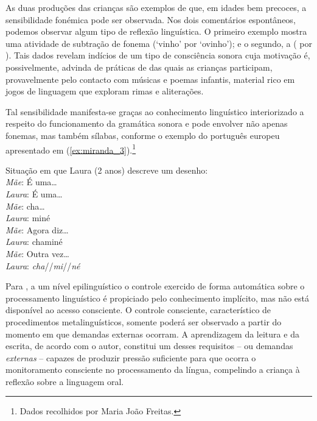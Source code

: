 \documentclass[output=paper]{LSP/langsci}
\begin{document}
\ea\label{ex:miranda_2}
\z
\z

As duas produções das crianças são exemplos de que, em idades bem precoces, a sensibilidade fonémica pode ser observada. Nos dois comentários espontâneos, podemos observar algum tipo de reflexão linguística. O primeiro exemplo mostra uma atividade de subtração de fonema (`vinho' por `ovinho'); e o segundo, a  ( por ). Tais dados revelam indícios de um tipo de consciência sonora cuja motivação é, possivelmente, advinda de práticas de  das quais as crianças participam, provavelmente pelo contacto com músicas e poemas infantis, material rico em jogos de linguagem que exploram rimas e aliterações.

Tal sensibilidade manifesta-se graças ao conhecimento linguístico interiorizado a respeito do funcionamento da gramática sonora e pode envolver não apenas fonemas, mas também sílabas, conforme o exemplo do português europeu apresentado em (\ref{ex:miranda_3}).\footnote{Dados recolhidos por Maria João Freitas.}

\ea\label{ex:miranda_3}
Situação em que Laura (2 anos) descreve um desenho:\\
\textit{Mãe}: É uma\ldots\\
\textit{Laura}: É uma\ldots\\
\textit{Mãe}: cha\ldots\\
\textit{Laura}: miné\\
\textit{Mãe}: Agora diz\ldots\\
\textit{Laura}: chaminé\\
\textit{Mãe}: Outra vez\ldots\\
\textit{Laura}: \textit{cha}//\textit{mi}//\textit{né}
\z

Para \citet{gombert1992,gombert2003}, a um nível epilinguístico o controle exercido de forma automática sobre o processamento linguístico é propiciado pelo conhecimento implícito, mas não está disponível ao acesso consciente. O controle consciente, característico de procedimentos metalinguísticos, somente poderá ser observado a partir do momento em que demandas externas ocorram. A aprendizagem da leitura e da escrita, de acordo com o autor, constitui um desses requisitos -- ou demandas \textit{externas} -- capazes de produzir pressão suficiente para que ocorra o monitoramento consciente no processamento da língua, compelindo a criança à reflexão sobre a linguagem oral.
\end{document}
